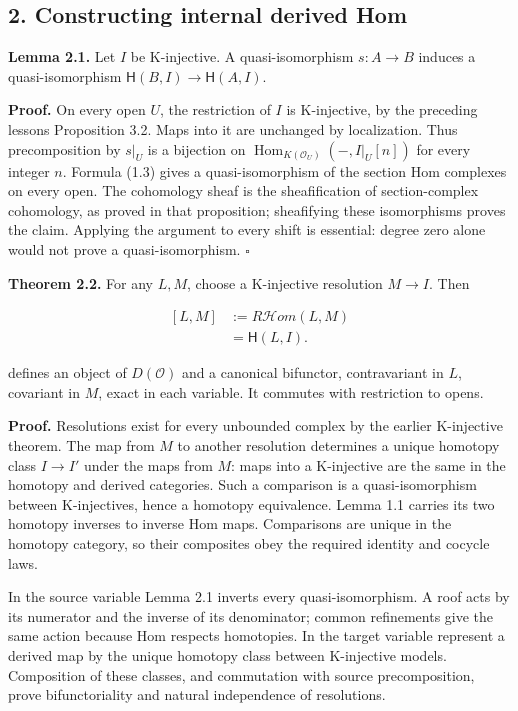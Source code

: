 \documentclass[
  english,
  11pt,
  a4paper,
]{article}
\begin{document}
\subsection{2. Constructing internal derived
Hom}\label{internal-derived-hom-and-ext-sheaves--2-constructing-internal-derived-hom}

\textbf{Lemma 2.1.} Let \(I\) be K-injective. A quasi-isomorphism
\(s:A\to B\) induces a quasi-isomorphism
\(\mathsf H(B,I)\to\mathsf H(A,I)\).

\textbf{Proof.} On every open \(U\), the restriction of \(I\) is
K-injective, by the preceding lesson\textquotesingle s Proposition 3.2.
Maps into it are unchanged by localization. Thus precomposition by
\(s|_U\) is a bijection on
\(\operatorname{Hom}_{K(\mathcal O_U)}(-,I|_U[n])\) for every integer
\(n\). Formula (1.3) gives a quasi-isomorphism of the section Hom
complexes on every open. The cohomology sheaf is the sheafification of
section-complex cohomology, as proved in that proposition; sheafifying
these isomorphisms proves the claim. Applying the argument to every
shift is essential: degree zero alone would not prove a
quasi-isomorphism. \(\square\)

\textbf{Theorem 2.2.} For any \(L,M\), choose a K-injective resolution
\(M\to I\). Then

\[\begin{aligned}
{}[L,M]&:=R\mathcal Hom(L,M)\\
&=\mathsf H(L,I).
\end{aligned}
\tag{2.1}\]

defines an object of \(D(\mathcal O)\) and a canonical bifunctor,
contravariant in \(L\), covariant in \(M\), exact in each variable. It
commutes with restriction to opens.

\textbf{Proof.} Resolutions exist for every unbounded complex by the
earlier K-injective theorem. The map from \(M\) to another resolution
determines a unique homotopy class \(I\to I'\) under the maps from
\(M\): maps into a K-injective are the same in the homotopy and derived
categories. Such a comparison is a quasi-isomorphism between
K-injectives, hence a homotopy equivalence. Lemma 1.1 carries its two
homotopy inverses to inverse Hom maps. Comparisons are unique in the
homotopy category, so their composites obey the required identity and
cocycle laws.

In the source variable Lemma 2.1 inverts every quasi-isomorphism. A roof
acts by its numerator and the inverse of its denominator; common
refinements give the same action because Hom respects homotopies. In the
target variable represent a derived map by the unique homotopy class
between K-injective models. Composition of these classes, and
commutation with source precomposition, prove bifunctoriality and
natural independence of resolutions.
\end{document}
